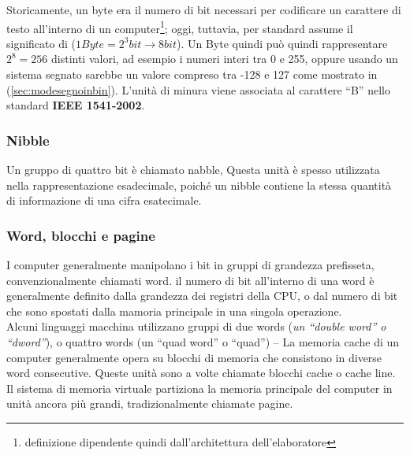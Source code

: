 \begin{defi}
  Storicamente, un byte era il numero di bit necessari per codificare un carattere di testo
  all'interno di un computer\footnote{definizione dipendente quindi dall'architettura
    dell'elaboratore}; oggi, tuttavia, per standard assume il significato di ($1Byte = 2^3bit \to 8bit$).
  Un Byte quindi può quindi rappresentare $2^8=256$ distinti valori, ad esempio i numeri interi tra 0 e 255,
  oppure usando un sistema segnato sarebbe un valore compreso tra -128 e 127 come mostrato
  in (\ref{sec:modesegnoinbin}). L'unità di minura viene associata al carattere ``B'' nello standard
  {\bf IEEE 1541-2002}. 
\end{defi}

\subsubsection{Nibble}
\label{sec:nibble}
\begin{defi}
  Un gruppo di quattro bit è chiamato nabble, Questa unità è spesso utilizzata nella rappresentazione esadecimale,
  poiché un nibble contiene la stessa quantità di informazione di una cifra esatecimale.
\end{defi}

\subsubsection{Word, blocchi e pagine}
\label{sec:wordblocchiepagine}
\begin{defi}
  I computer generalmente manipolano i bit in gruppi di grandezza prefisseta, convenzionalmente chiamati word. il
  numero di bit all'interno di una word è generalmente definito dalla grandezza dei registri della CPU, o dal
  numero di bit che sono spostati dalla mamoria principale in una singola operazione.\\
  Alcuni linguaggi macchina utilizzano gruppi di due words ({\it un ``double word'' o ``dword''}), o quattro words
  (un ``quad word'' o ``quad'') -- La memoria cache di un computer generalmente opera su blocchi di memoria
  che consistono in diverse word consecutive. Queste unità sono a volte chiamate blocchi cache o cache line. Il
  sistema di memoria virtuale partiziona la memoria principale del computer in unità ancora più grandi,
  tradizionalmente chiamate pagine.
\end{defi}

